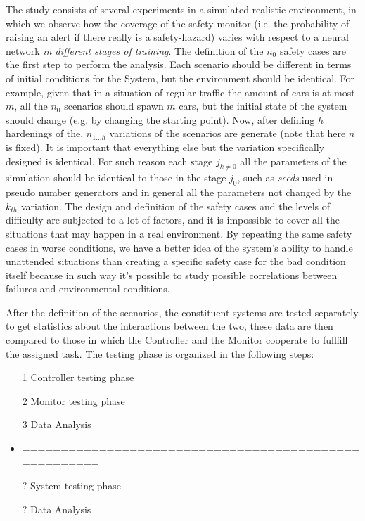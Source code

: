 The study consists of several experiments in a simulated realistic environment, in which we observe how the coverage of the safety-monitor (i.e. the probability of raising an alert if there really is a safety-hazard) varies with respect to a neural network \textsl{in different stages of training}.\newline
The definition of the $n_{0}$ safety cases are the first step to perform the analysis. Each scenario should be different in terms of initial conditions for the System, but the environment should be identical. For example, given that in a situation of regular traffic the amount of cars is at most $m$, all the $n_{0}$ scenarios should spawn $m$ cars, but the initial state of the system should change (e.g. by changing the starting point). Now, after defining $h$ hardenings of the, $n_{1\dots h}$ variations of the scenarios are generate (note that here $n$ is fixed). It is important that everything else but the variation specifically designed is identical. For such reason each stage $j_{k\neq 0}$ all the parameters of the simulation should be identical to those in the stage $j_{0}$, such as \textsl{seeds} used in pseudo number generators and in general all the parameters not changed by the $k_{th}$ variation.\newline
The design and definition of the safety cases and the levels of difficulty are subjected to a lot of factors, and it is impossible to cover all the situations that may happen in a real environment. By repeating the same safety cases in worse conditions, we have a better idea of the system's ability to handle unattended situations than creating a specific safety case for the bad condition itself because in such way it's possible to study possible correlations between failures and environmental conditions.\newline\newline
\newpage


After the definition of the scenarios, the constituent systems are tested separately to get statistics about the interactions between the two, these data are then compared to those in which the Controller and the Monitor cooperate to fullfill the assigned task.\newline
The testing phase is organized in the following steps:

\begin{itemize}
	\item[1] Controller testing phase
	\item[2] Monitor testing phase
	\item[3] Data Analysis
	\item ======================================================
	\item[?] System testing phase
	\item[?] Data Analysis
\end{itemize}

